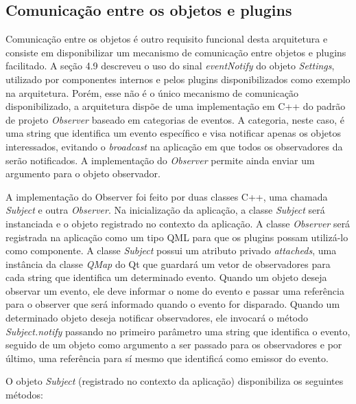 \subsection{Comunicação entre os objetos e plugins}
Comunicação entre os objetos é outro requisito funcional desta arquitetura e consiste em disponibilizar um mecanismo de comunicação entre objetos e plugins facilitado. A seção 4.9 descreveu o uso do sinal \textit{eventNotify} do objeto \textit{Settings}, utilizado por componentes internos e pelos plugins disponibilizados como exemplo na arquitetura. Porém, esse não é o único mecanismo de comunicação disponibilizado, a arquitetura dispõe de uma implementação em C++ do padrão de projeto \textit{Observer} baseado em categorias de eventos. A categoria, neste caso, é uma string que identifica um evento específico e visa notificar apenas os objetos interessados, evitando o \textit{broadcast} na aplicação em que todos os observadores da serão notificados. A implementação do \textit{Observer} permite ainda enviar um argumento para o objeto observador.\par

A implementação do Observer foi feito por duas classes C++, uma chamada \textit{Subject} e outra \textit{Observer}. Na inicialização da aplicação, a classe \textit{Subject} será instanciada e o objeto registrado no contexto da aplicação. A classe \textit{Observer} será registrada na aplicação como um tipo QML para que os plugins possam utilizá-lo como componente. A classe \textit{Subject} possui um atributo privado \textit{attacheds}, uma instância da classe \textit{QMap} do Qt que guardará um vetor de observadores para cada string que identifica um determinado evento. Quando um objeto deseja observar um evento, ele deve informar o nome do evento e passar uma referência para o observer que será informado quando o evento for disparado. Quando um determinado objeto deseja notificar observadores, ele invocará o método \textit{Subject.notify} passando no primeiro parâmetro uma string que identifica o evento, seguido de um objeto como argumento a ser passado para os observadores e por último, uma referência para sí mesmo que identificá como emissor do evento.

O objeto \textit{Subject} (registrado no contexto da aplicação) disponibiliza os seguintes métodos:

